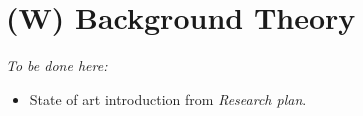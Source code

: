\chapter{(W) Background Theory}\label{ch:backGroundTheory}
    \emph{To be done here:}
    \begin{itemize}
        \item State of art introduction from \emph{Research plan}.
    \end{itemize}
    
